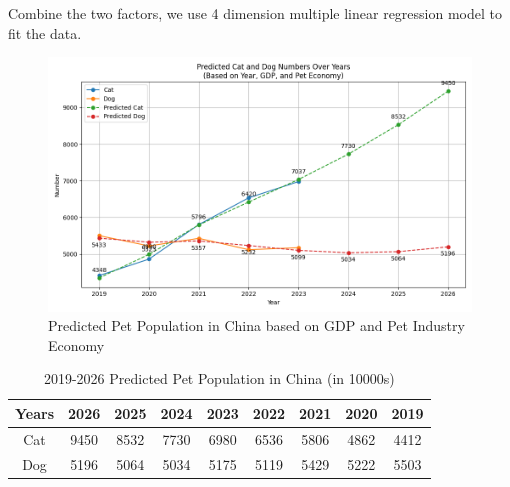 \documentclass[withoutpreface,bwprint]{cumcmthesis} %
\begin{document}
\clearpage
\par Combine the two factors, we use 4 dimension multiple linear regression model to fit the data.
\begin{figure}[htbp]
	\centering
	\includegraphics[width=.99\textwidth]{Figure_13}
	\caption{Predicted Pet Population in China based on GDP and Pet Industry Economy}
\end{figure}
\begin{table}[!htbp]
    \small
    \caption{2019-2026 Predicted Pet Population in China (in 10000s)} \centering
    \begin{tabular}{ccccccccc}
    \toprule[1.5pt]
    Years & 2026 & 2025 & 2024 & 2023 & 2022 & 2021 & 2020 & 2019 \\
    \midrule[1pt]
    Cat & 9450 & 8532 & 7730 & 6980 & 6536 & 5806 & 4862 & 4412 \\
    Dog & 5196 & 5064 & 5034 & 5175 & 5119 & 5429 & 5222 & 5503 \\
    \bottomrule[1.5pt]
    \end{tabular}
\end{table}
\end{document}
